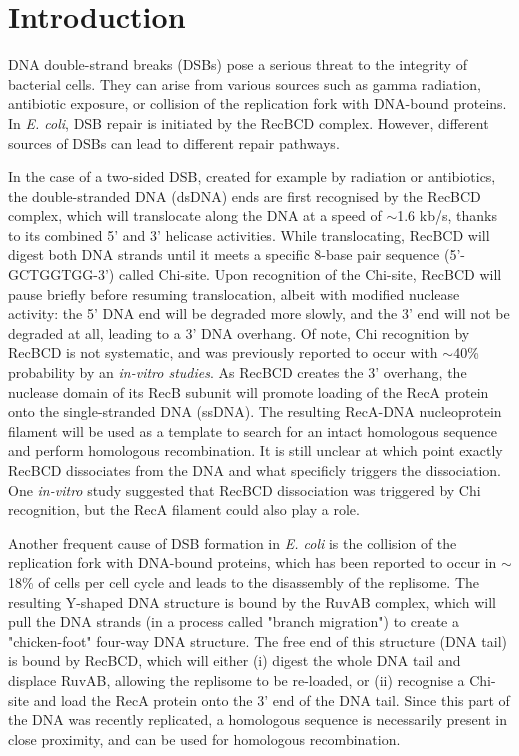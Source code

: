 \section*{Introduction}

DNA double-strand breaks (DSBs) pose a serious threat to the integrity of bacterial cells. They can arise from various sources such as gamma radiation\cite{Krasin1977}, antibiotic exposure, or collision of the replication fork with DNA-bound proteins\cite{Dillingham2008}. In \emph{E. coli}, DSB repair is initiated by the RecBCD complex. However, different sources of DSBs can lead to different repair pathways.

In the case of a two-sided DSB, created for example by radiation or antibiotics, the double-stranded DNA (dsDNA) ends are first recognised by the RecBCD complex, which will translocate along the DNA at a speed of $\sim$1.6 kb/s, thanks to its combined 5' and 3' helicase activities\cite{Wiktor2018}. While translocating, RecBCD will digest both DNA strands until it meets a specific 8-base pair sequence (5'-GCTGGTGG-3') called Chi-site. Upon recognition of the Chi-site, RecBCD will pause briefly before resuming translocation, albeit with modified nuclease activity: the 5' DNA end will be degraded more slowly, and the 3' end will not be degraded at all, leading to a 3' DNA overhang. Of note, Chi recognition by RecBCD is not systematic, and was previously reported to occur with $\sim$40\% probability by an \emph{in-vitro studies}\cite{Taylor1992}. As RecBCD creates the 3' overhang, the nuclease domain of its RecB subunit will promote loading of the RecA protein onto the single-stranded DNA (ssDNA)\cite{Churchill2000, Spies2006}. The resulting RecA-DNA nucleoprotein filament will be used as a template to search for an intact homologous sequence and perform homologous recombination. It is still unclear at which point exactly RecBCD dissociates from the DNA and what specificly triggers the dissociation. One \emph{in-vitro} study suggested that RecBCD dissociation was triggered by Chi recognition\cite{Taylor1999}, but the RecA filament could also play a role.

Another frequent cause of DSB formation in \emph{E. coli} is the collision of the replication fork with DNA-bound proteins, which has been reported to occur in $\sim$18\% of cells per cell cycle\cite{Sinha2018} and leads to the disassembly of the replisome\cite{Michel1997}. The resulting Y-shaped DNA structure is bound by the RuvAB complex, which will pull the DNA strands (in a process called "branch migration") to create a "chicken-foot" four-way DNA structure\cite{Seigneur1998}. The free end of this structure (DNA tail) is bound by RecBCD, which will either (i) digest the whole DNA tail and displace RuvAB, allowing the replisome to be re-loaded, or (ii) recognise a Chi-site and load the RecA protein onto the 3' end of the DNA tail\cite{Michel2001}. Since this part of the DNA was recently replicated, a homologous sequence is necessarily present in close proximity, and can be used for homologous recombination.

